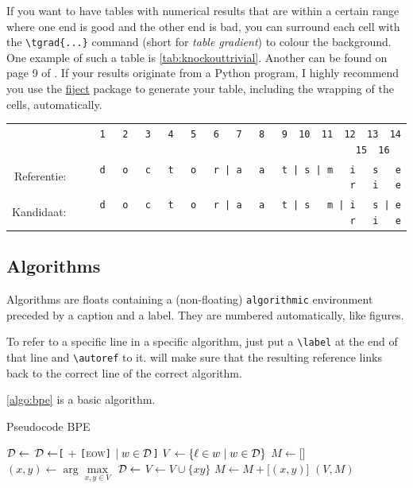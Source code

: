 If you want to have tables with numerical results that are within a certain range where one end is good and the other end is bad, you can surround each cell with the \verb|\tgrad{...}| command (short for \emph{table gradient}) to colour the background. One example of such a table is \autoref{tab:knockouttrivial}. Another can be found on page 9 of \textcite{bauwens_2024_bpe-knockout}. If your results originate from a Python program, I highly recommend you use the \href{https://github.com/bauwenst/fiject}{\textsf{fiject}} package to generate your table, including the wrapping of the cells, automatically.

\begin{center}
\hspace*{-2em}
\begin{tabular}{rr}
			   & \verb/  1   2   3   4   5   6   7   8   9  10  11  12  13  14  15  16  / \\
	Referentie:& \verb/d   o   c   t   o   r | a   a   t | s | m   i   s   e   r   i   e/ \\
	Kandidaat: & \verb/d   o   c   t   o   r | a   a   t | s   m | i   s | e   r   i   e/
\end{tabular}
\end{center}
 
\subsection{Algorithms}
Algorithms are floats containing a (non-floating) \verb|algorithmic| environment preceded by a caption and a label. They are numbered automatically, like figures.

To refer to a specific line in a specific algorithm, just put a \verb|\label| at the end of that line and \verb|\autoref| to it. \repo will make sure that the resulting reference links back to the correct line of the correct algorithm.

\autoref{algo:bpe} is a basic algorithm.
\begin{algorithm}[H]
	\caption{Pseudocode BPE}
	\label{algo:bpe}
	\begin{algorithmic}[1]
			\State $\mathcal{D} \gets$ 
			\State $\mathcal{D} \gets$\texttt{[} + \texttt{[}\textsc{eow}\texttt{]} $\mid w\in \mathcal{D}$\texttt{]} 
			\State $V \gets \{\ell \in w \mid w \in \mathcal{D}\}$\label{line:bpeinit}
			\State $M \gets \texttt{[]}$
				\State $(x,y) \gets \arg\max\limits_{x,y\in V}$ \label{line:bpeargmax}
				\State $\mathcal{D}\gets$ \label{line:replace}
				\State $V\gets V \cup \{xy\}$
				\State $M\gets M + \texttt{[}(x,y)\texttt{]}$
			\EndWhile
			\vspace{-0.31em}\State\Return $(V,M)$
		\EndFunction
	\end{algorithmic}
\end{algorithm}

